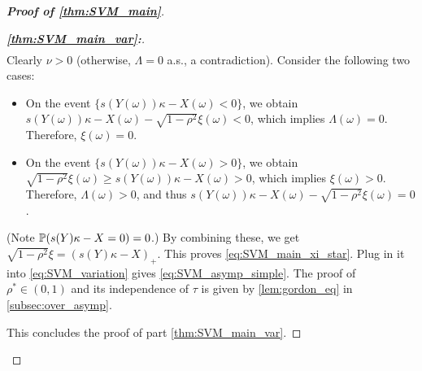 \begin{proof}[\textbf{Proof of \cref{thm:SVM_main}}]
\begin{proof}[\textbf{\emph{\ref{thm:SVM_main_var}:}}]
\begin{equation*}
\begin{aligned}
    \end{aligned}
\end{equation*}
Clearly $\nu > 0$ (otherwise, $\Lambda = 0$ a.s., a contradiction). Consider the following two cases:
\begin{itemize}
    \item On the event $\{ s(Y(\omega))\kappa - X(\omega) < 0\}$, we obtain $s(Y(\omega))\kappa - X(\omega) - \sqrt{1 - \rho^2} \xi(\omega) < 0$, which implies $\Lambda(\omega) = 0$. Therefore, $\xi(\omega) = 0$.
    \item On the event $\{ s(Y(\omega))\kappa - X(\omega) > 0\}$, we obtain $\sqrt{1 - \rho^2} \xi(\omega) \ge s(Y(\omega))\kappa - X(\omega) > 0$, which implies $\xi(\omega) > 0$. Therefore, $\Lambda(\omega) > 0$, and thus $s(Y(\omega))\kappa - X(\omega) - \sqrt{1 - \rho^2} \xi(\omega) = 0$.
\end{itemize}
(Note $\P(s(Y)\kappa - X = 0) = 0$.) By combining these, we get $\sqrt{1 - \rho^2}\xi = (s(Y)\kappa - X)_+$. This proves \cref{eq:SVM_main_xi_star}. Plug in it into \cref{eq:SVM_variation} gives \cref{eq:SVM_asymp_simple}. The proof of $\rho^* \in (0, 1)$ and its independence of $\tau$ is given by \cref{lem:gordon_eq} in \cref{subsec:over_asymp}. 

This concludes the proof of part \ref{thm:SVM_main_var}.
\end{proof}






\end{proof}
